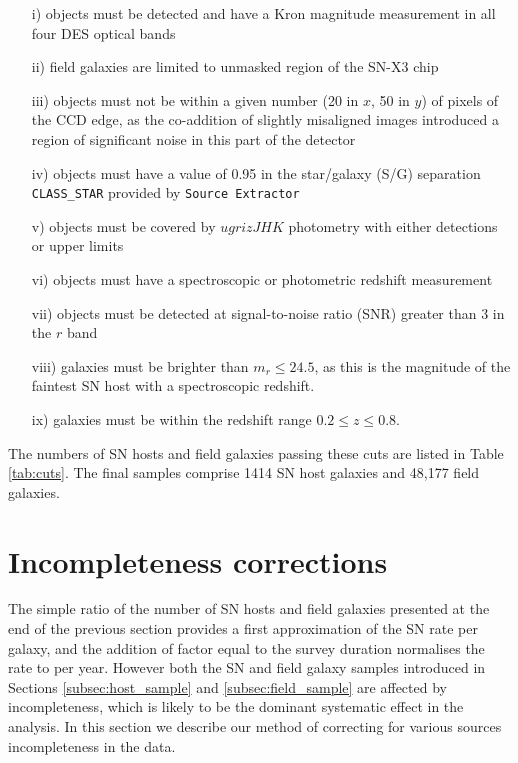 \documentclass[fleqn,usenatbib]{mnras}
\begin{document}
\begin{enumerate}
    \item[i)] objects must be detected and have a Kron magnitude measurement in all four DES optical bands
    
    \item[ii)] field galaxies are limited to unmasked region of the SN-X3 chip \cite{Hartley2020}
    
    \item[iii)] objects must not be within a given number (20 in $x$, 50 in $y$) of pixels of the CCD edge, as the co-addition of slightly misaligned images introduced a region of significant noise in this part of the detector
    
    \item[iv)] objects must have a value of 0.95 in the star/galaxy (S/G) separation \texttt{CLASS\_STAR} provided by \texttt{Source Extractor} \citep{Bertin1996}
    
    \item[v)]  objects must be covered by $ugrizJHK$ photometry with either detections or upper limits
    
    \item[vi)] objects must have a spectroscopic or photometric redshift measurement
    
    \item[vii)] objects must be detected at signal-to-noise ratio (SNR) greater than 3 in the $r$ band
    
    \item[viii)] galaxies must be brighter than $m_r \leq 24.5$, as this is the magnitude of the faintest SN host with a spectroscopic redshift.
    
    \item[ix)] galaxies must be within the redshift range $0.2 \leq z \leq 0.8$.
\end{enumerate}

The numbers of SN hosts and field galaxies passing these cuts are listed in Table \ref{tab:cuts}. The final samples comprise 1414 SN host galaxies and 48,177 field galaxies.


\section{Incompleteness corrections}
\label{sec:incompleteness}
The simple ratio of the number of SN hosts and field galaxies presented at the end of the previous section provides a first approximation of the SN rate per galaxy, and the addition of factor equal to the survey duration normalises the rate to per year. However both the SN and field galaxy samples introduced in Sections \ref{subsec:host_sample} and \ref{subsec:field_sample} are affected by incompleteness, which is likely to be the dominant systematic effect in the analysis. In this section we describe our method of correcting for various sources incompleteness in the data.
\end{document}
